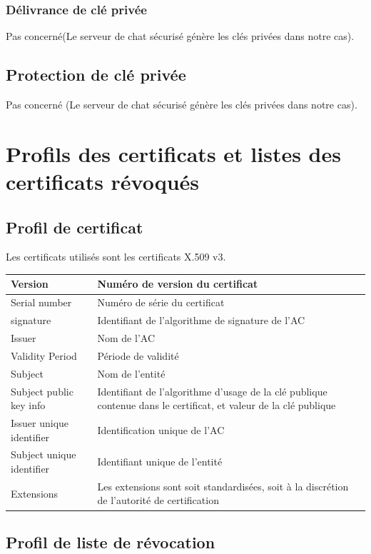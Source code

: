 \documentclass[a4paper,11pt,french]{article}
\begin{document}
\subsubsection{Délivrance de clé privée}
Pas concerné(Le serveur de chat sécurisé génère les clés privées dans notre cas).

\subsection{Protection de clé privée}
Pas concerné (Le serveur de chat sécurisé génère les clés privées dans notre cas).

\section{Profils des certificats et listes des certificats révoqués}
\subsection{Profil de certificat}
Les certificats utilisés sont les certificats X.509 v3.\\

\begin{tabular}{|l|p{10cm}|}
\hline
Version  & Numéro de version du certificat 
\\
\hline
Serial number  & Numéro de série du certificat
\\
\hline
signature  & Identifiant de l'algorithme de signature de l'AC 
\\
\hline
Issuer  & Nom de l'AC
\\
\hline
Validity Period  & Période de validité
\\
\hline
Subject  & Nom de l'entité
\\
\hline
Subject public key info &  Identifiant de l'algorithme d'usage de la clé publique contenue dans le certificat, et valeur de la clé publique
\\
\hline
 Issuer unique identifier  & Identification unique de l'AC
\\
\hline
Subject unique identifier  & Identifiant unique de l'entité
\\
\hline
Extensions  & Les extensions sont soit standardisées, soit à la discrétion de l’autorité de certification
\\
\hline
\end{tabular}


\subsection{Profil de liste de révocation}
\end{document}
